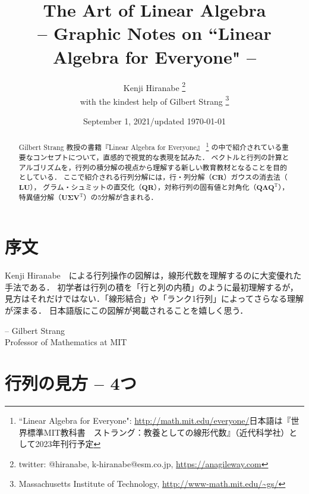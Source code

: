\documentclass[letterpaper]{article}
\DeclareRobustCommand\transp{^{\mathrm{T}}}
\begin{document}
\title{The Art of Linear Algebra\\
\vspace{5pt}
\large{
-- Graphic Notes on ``Linear Algebra for Everyone" --
}
}

\author{Kenji Hiranabe
\thanks{twitter: @hiranabe, k-hiranabe@esm.co.jp, \url{https://anagileway.com}} \\
with the kindest help of Gilbert Strang
\thanks{Massachusetts Institute of Technology, \url{http://www-math.mit.edu/\~gs/}}
}

\date{September 1, 2021/updated \today}

\maketitle

\vspace{-5pt}
 
\begin{abstract}
Gilbert Strang 教授の書籍『Linear Algebra for Everyone』
\footnote{``Linear Algebra for Everyone":
\url{http://math.mit.edu/everyone/}日本語は『世界標準MIT教科書　ストラング：教養としての線形代数』（近代科学社）として2023年刊行予定}
の中で紹介されている重要なコンセプトについて，直感的で視覚的な表現を試みた．
ベクトルと行列の計算とアルゴリズムを，行列の積分解の視点から理解する新しい教育教材となることを目的としている．
ここで紹介される行列分解には，行・列分解（$\bm{CR}$）ガウスの消去法（$\bm{LU}$），
グラム・シュミットの直交化（$\bm{QR}$），対称行列の固有値と対角化（$\bm{Q \Lambda Q\transp}$），
特異値分解（$\bm{U \Sigma V\transp}$）の5分解が含まれる．
\end{abstract}

\section*{序文}
Kenji Hiranabe　による行列操作の図解は，線形代数を理解するのに大変優れた手法である．
初学者は行列の積を「行と列の内積」のように最初理解するが，
見方はそれだけではない．「線形結合」や「ランク1行列」によってさらなる理解が深まる．
日本語版にこの図解が掲載されることを嬉しく思う．
\begin{flushright}
-- Gilbert Strang \\ Professor of Mathematics at MIT
\end{flushright}

\tableofcontents

\section{行列の見方 -- 4つ}
\end{document}

